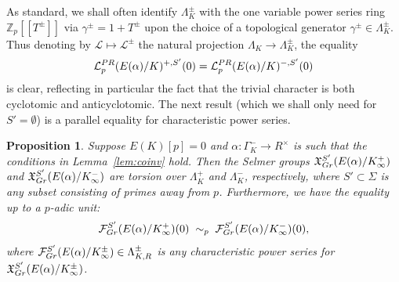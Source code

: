 \documentclass[a4paper,10pt]{amsart}
\numberwithin{equation}{section}
\numberwithin{equation}{section}
\theoremstyle{plain}
\theoremstyle{definition}
\theoremstyle{definition}
\theoremstyle{plain}
\newtheorem{prop}[thm]{Proposition}
\theoremstyle{plain}
\theoremstyle{plain}
\theoremstyle{plain}
\newcommand{\Z}{\mathbb{Z}}
\newcommand{\X}{\mathfrak{X}}
\newcommand{\Lcal}{\mathcal{L}}
\newcommand{\Fcal}{\mathcal{F}}
\begin{document}
As standard, we shall often identify $\Lambda_K^\pm$ with the one variable power series ring $\Z_p[\![T^\pm]\!]$ via $\gamma^\pm=1+T^\pm$ upon the choice of a topological generator $\gamma^\pm\in\Lambda_K^\pm$. Thus denoting by $\mathcal{L}\mapsto\mathcal{L}^\pm$ the natural projection $\Lambda_K\rightarrow\Lambda_K^\pm$, the equality 
\[
\Lcal_p^{\rm PR}(E(\alpha)/K)^{+,S'}(0)=\Lcal_p^{\rm PR}(E(\alpha)/K)^{-,S'}(0)
\] 
is clear, reflecting in particular the fact that the trivial character is both cyclotomic and anticyclotomic. The next  result (which we shall only need for $S'=\emptyset$) is a parallel equality for characteristic power series. 

\begin{prop}\label{prop:euler-char}
Suppose $E(K)[p]=0$ and $\alpha:\Gamma_K^-\rightarrow R^\times$ is such that the conditions in Lemma~\ref{lem:coinv} hold.
Then the Selmer groups $\mathfrak{X}_{\rm Gr}^{S'}(E(\alpha)/K_\infty^+)$ and $\mathfrak{X}^{S'}_{\rm Gr}(E(\alpha)/K_\infty^-)$ are torsion over $\Lambda_K^+$ and $\Lambda_K^-$, respectively, where $S'\subset\Sigma$ is any subset consisting of primes away from $p$. 
%
Furthermore, we have the equality up to a $p$-adic unit:
\[
\mathcal{F}_{\rm Gr}^{S'}(E(\alpha)/K_\infty^+)(0)\;\sim_p\;\mathcal{F}_{\rm Gr}^{S'}(E(\alpha)/K_\infty^-)(0),
\]
where $\Fcal_{\rm Gr}^{S'}(E(\alpha)/K_\infty^\pm)\in\Lambda^\pm_{K,R}$ is any characteristic power series for $\X_{\rm Gr}^{S'}(E(\alpha)/K_\infty^\pm)$.
\end{prop}
\end{document}
